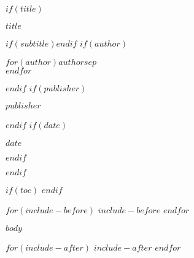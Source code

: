 \documentclass[
  $if(classoption)$$for(classoption)$$classoption$$sep$,$endfor$$else$oneside$endif$,
  $if(fontsize)$$fontsize$$else$11pt$endif$
]{scrbook}
\newcommand{\PrintTitle}{
  \begin{titlepage}
    \centering
    {\sffamily\bfseries\LARGE $title$ \par}
    $if(subtitle)$\vspace{6pt}{\sffamily\large $subtitle$ \par}$endif$
    \vspace{18pt}
    $if(author)$
      {\sffamily\normalsize $for(author)$$author$$sep$ \\ $endfor$ \par}
    $endif$
    \vspace{12pt}
    $if(publisher)$
      {\sffamily\small $publisher$ \par}
    $endif$
    \vfill
    $if(date)$
      {\sffamily\small $date$ \par}
    $endif$
  \end{titlepage}
}
\begin{document}
\frontmatter
$if(title)$
\PrintTitle
$endif$

$if(toc)$
{\hypersetup{linkcolor=black}
\tableofcontents
\clearpage}
$endif$

\mainmatter

$for(include-before)$
$include-before$
$endfor$

$body$

$for(include-after)$
$include-after$
$endfor$
\end{document}

